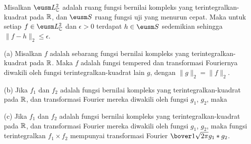  Misalkan $\eusm L_{\Bbb C}^2$ adalah ruang fungsi
bernilai kompleks yang terintegralkan-kuadrat pada $\Bbb R$, dan $\eusm S$
ruang fungsi uji yang menurun cepat. Maka untuk setiap
$f\in\eusm L_{\Bbb C}^2$ dan $\epsilon>0$ terdapat $h\in\eusm S$ sedemikian
sehingga $\|f-h\|_2\le\epsilon$.


 (a) Misalkan $f$ adalah sebarang fungsi bernilai
kompleks yang terintegralkan-kuadrat pada $\Bbb R$. Maka $f$ adalah fungsi
tempered dan transformasi Fouriernya diwakili oleh fungsi
terintegralkan-kuadrat lain $g$, dengan $\|g\|_2=\|f\|_2$.

(b) Jika $f_1$ dan $f_2$ adalah fungsi bernilai kompleks yang
terintegralkan-kuadrat pada $\Bbb R$, dan transformasi Fourier mereka diwakili
oleh fungsi $g_1$, $g_2$, maka


(c) Jika $f_1$ dan $f_2$ adalah fungsi bernilai kompleks yang
terintegralkan-kuadrat pada $\Bbb R$, dan transformasi Fourier mereka diwakili
oleh fungsi $g_1$, $g_2$, maka fungsi terintegralkan $f_1\times f_2$ mempunyai
transformasi Fourier $\bover1{\sqrt{2\pi}}g_1*g_2$.

